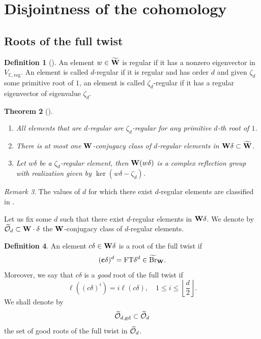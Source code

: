 \documentclass[article, 10pt, oneside, reqno]{amsart}
\theoremstyle{plain}
\newtheorem{thm}{Theorem}[subsection]
\theoremstyle{definition}
\newtheorem{defi}[thm]{Definition}
\theoremstyle{remark}
\newtheorem{rque}[thm]{Remark}
\newcommand{\FT}{\mathrm{FT}}
\newcommand{\C}{\mathbb{C}}
\newcommand{\reg}{\mathrm{reg}}
\newcommand{\gd}{\mathrm{gd}}
\newcommand{\cbf}{\mathbf{c}}
\begin{document}
\section{Disjointness of the cohomology}

\subsection{Roots of the full twist}

\begin{defi}[\cite{SpringerRegularElements}]
An element $w \in \widetilde{\mathbf{W}}$ is regular if it has a nonzero eigenvector in $V_{\C, \reg}$. An element is called $d$-regular if it is regular and has order $d$ and given $\zeta_d$ some primitive root of $1$, an element is called $\zeta_d$-regular if it has a regular eigenvector of eigenvalue $\zeta_d$. 
\end{defi}

\begin{thm}[]\leavevmode
\begin{enumerate}
\item All elements that are $d$-regular are $\zeta_d$-regular for any primitive $d$-th root of $1$.
\item There is at most one $\mathbf{W}$-conjugacy class of $d$-regular elements in $\mathbf{W}\delta \subset \widetilde{\mathbf{W}}$. 
\item Let $w\delta$ be a $\zeta_d$-regular element, then $\mathbf{W}(w\delta)$ is a complex reflection group with realization given by $\ker(w\delta - \zeta_d)$.
\end{enumerate}
\end{thm}

\begin{rque}
The values of $d$ for which there exist $d$-regular elements are classified in \cite[Section 6 for $\delta = 1$ and Section 8 for nontrivial $\delta$]{SpringerRegularElements}.
\end{rque} 

Let us fix some $d$ such that there exist $d$-regular elements in $\mathbf{W}\delta$. We denote by $\widetilde{\mathcal{O}}_d \subset \mathbf{W}\cdot \delta$ the $\mathbf{W}$-conjugacy class of $d$-regular elements.

\begin{defi}\label{defi:good-root-of-full-twist}
An element $c\delta \in \mathbf{W}\delta$ is a root of the full twist if 
$$(\cbf\delta)^d = \FT \delta^d \in \widetilde{\Br}_{\Wbf}.$$
Moreover, we say that $c\delta$ is a \emph{good} root of the full twist if 
$$\ell((c\delta)^i) = i\ell(c\delta), \quad 1 \leq i \leq \left\lfloor \frac{d}{2} \right\rfloor.$$
We shall denote by 
$$\widetilde{\Ocal}_{d,\gd} \subset \widetilde{\Ocal}_d$$
the set of good roots of the full twist in $\widetilde{\mathcal{O}}_d$.
\end{defi}
\end{document}
